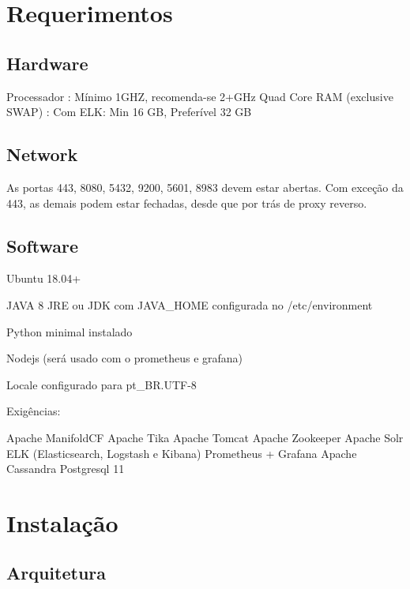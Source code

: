 \documentclass[]{book}
\begin{document}
\hypertarget{req}{%
\chapter{Requerimentos}\label{req}}

\hypertarget{hardware}{%
\section{Hardware}\label{hardware}}

Processador : Mínimo 1GHZ, recomenda-se 2+GHz Quad Core
RAM (exclusive SWAP) :
Com ELK: Min 16 GB, Preferível 32 GB

\hypertarget{network}{%
\section{Network}\label{network}}

As portas 443, 8080, 5432, 9200, 5601, 8983 devem estar abertas. Com exceção da 443, as demais podem estar fechadas, desde que por trás de proxy reverso.

\hypertarget{software}{%
\section{Software}\label{software}}

Ubuntu 18.04+

JAVA 8 JRE ou JDK com JAVA\_HOME configurada no /etc/environment

Python minimal instalado

Nodejs (será usado com o prometheus e grafana)

Locale configurado para pt\_BR.UTF-8

Exigências:

Apache ManifoldCF
Apache Tika
Apache Tomcat
Apache Zookeeper
Apache Solr
ELK (Elasticsearch, Logstash e Kibana)
Prometheus + Grafana
Apache Cassandra
Postgresql 11

\hypertarget{instalacao}{%
\chapter{Instalação}\label{instalacao}}

\hypertarget{arquitetura}{%
\section{Arquitetura}\label{arquitetura}}
\end{document}
